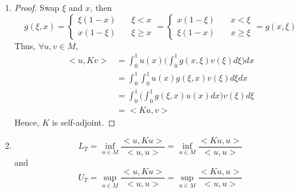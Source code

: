 \documentclass[paper=a4, fontsize=11pt]{scrartcl} %
\numberwithin{equation}{section} %
\numberwithin{figure}{section} %
\numberwithin{table}{section} %
\begin{document}
\begin{enumerate}
		\item 
			\begin{proof}
				Swap $\xi$ and $x$, then
				\begin{equation}
					g(\xi, x) = 
					\left\{
						\begin{aligned}
							\xi(1-x) & \quad \xi<x\\
							x(1-\xi) & \quad \xi\geq x
						\end{aligned}
					\right.
					=
					\left\{
						\begin{aligned}
							x(1-\xi) & \quad x < \xi\\
							\xi(1-x) & \quad x \geq \xi
						\end{aligned}
					\right.
					=g(x,\xi)
				\end{equation}
				Thus, $\forall u, v\in M$,
				\begin{equation}
					\begin{aligned}
						<u, Kv> & = \int_{0}^{1} u(x) \Bigg(\int_{0}^{1} g(x, \xi) v(\xi) d\xi\Bigg) dx\\
								& = \int_{0}^{1} \int_{0}^{1} u(x) g(\xi, x) v(\xi) d\xi dx\\
								& = \int_{0}^{1} \Bigg(\int_{0}^{1} g(\xi, x) u(x) dx\Bigg) v(\xi) d\xi\\
								& = <Ku, v>
					\end{aligned}
				\end{equation}
				Hence, $K$ is self-adjoint.
			\end{proof}
		\item 
			\begin{equation}
				L_T = \inf\limits_{u\in M} \frac{<u, Ku>}{<u, u>} = \inf\limits_{u\in M} \frac{<Ku, u>}{<u, u>}
			\end{equation}
			and
			\begin{equation}
				U_T = \sup\limits_{u\in M} \frac{<u, Ku>}{<u, u>} = \sup\limits_{u\in M} \frac{<Ku, u>}{<u, u>}
			\end{equation}
			
	\end{enumerate}
\end{document}
